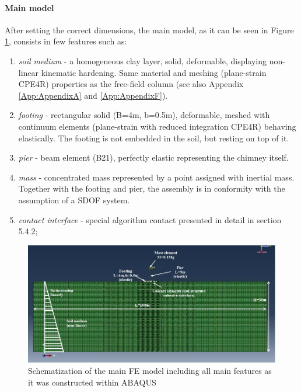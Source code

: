 			
	\newpage
	\paragraph{Main model}
	After setting the correct dimensions, the main model, as it can be seen in Figure \ref{mainM}, consists in few features such as:
	\begin{enumerate}
		\item \textit{soil medium} - a homogeneous clay layer, solid, deformable, displaying non-linear kinematic hardening. Same material and meshing (plane-strain CPE4R) properties as the free-field column (see also Appendix \ref{App:AppendixA} and \ref{App:AppendixF}).
		\item \textit{footing} -  rectangular solid (B=4m, b=0.5m), deformable, meshed with continuum elements (plane-strain with reduced integration CPE4R) behaving elastically. The footing is not embedded in the soil, but resting on top of it.
		\item \textit{pier} - beam element (B21), perfectly elastic representing the chimney itself.
		\item \textit{mass} - concentrated mass represented by a point assigned with inertial mass. Together with the footing and pier, the assembly is in conformity with the assumption of a SDOF system.
		\item \textit{contact interface} - special algorithm contact presented in detail in section 5.4.2;
	\end{enumerate}
	
		\begin{figure}[!h]
			\centering
			\includegraphics[width=0.9\linewidth]{"mainmodel"}
			\caption{Schematization of the main FE model including all main features as it was constructed within ABAQUS}
			\label{mainM}
		\end{figure}
		
